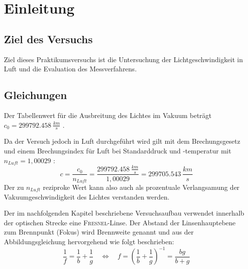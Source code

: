 \chapter{Einleitung}
\section{Ziel des Versuchs}
Ziel dieses Praktikumsversuchs ist die Untersuchung der Lichtgeschwindigkeit in Luft und die Evaluation des Messverfahrens.
%
\section{Gleichungen}
Der Tabellenwert für die Ausbreitung des Lichtes im Vakuum beträgt $ c_0 = \SI{299792,458}{\frac{km}{s}} $ \cite{Haberle.2007}.\par
Da der Versuch jedoch in Luft durchgeführt wird gilt mit dem Brechungsgesetz und einem Brechungsindex für Luft bei
Standarddruck und -temperatur mit $ n_{Luft}=1,00029 $ \cite{Halliday.2005}:
\begin{equation}
    c = \frac{c_0}{n_{Luft}} = \frac{\SI{299792,458}{\frac{km}{s}}}{1,00029} = \SI{299705,543}{\frac{km}{s}}
    \label{eq:brechung_luft}
\end{equation}
Der zu \(n_{Luft}\) reziproke Wert kann also auch als prozentuale Verlangsamung der Vakuumgeschwindigkeit des Lichtes
verstanden werden.\par\medskip
%
Der im nachfolgenden Kapitel beschriebene Versuchsaufbau verwendet innerhalb der optischen Strecke eine \textsc{Fresnel}-Linse.
Der Abstand der Linsenhauptebene zum Brennpunkt (Fokus) wird Brennweite genannt und aus der Abbildungsgleichung hervorgehend
wie folgt beschrieben:
\begin{equation}
    \frac{1}{f} = \frac{1}{b}+\frac{1}{g} \quad \Leftrightarrow \quad f = \left(\frac{1}{b}+\frac{1}{g}\right)^{-1}=\frac{b g}{b + g}
    \label{eq:brenn}
\end{equation}
